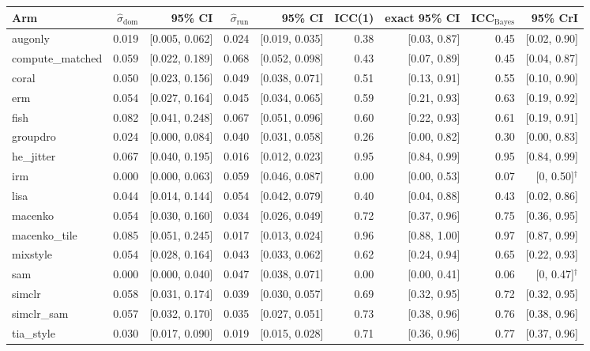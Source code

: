 \begin{tabular}{lrrrrrrrr}
\toprule
Arm & $\hat\sigma_\text{dom}$ & 95\% CI & $\hat\sigma_\text{run}$ & 95\% CI & ICC(1) & exact 95\% CI & ICC$_\text{Bayes}$ & 95\% CrI \\
\midrule
augonly & 0.019 & [0.005, 0.062] & 0.024 & [0.019, 0.035] & 0.38 & [0.03, 0.87] & 0.45 & [0.02, 0.90] \\
compute\_matched & 0.059 & [0.022, 0.189] & 0.068 & [0.052, 0.098] & 0.43 & [0.07, 0.89] & 0.45 & [0.04, 0.87] \\
coral & 0.050 & [0.023, 0.156] & 0.049 & [0.038, 0.071] & 0.51 & [0.13, 0.91] & 0.55 & [0.10, 0.90] \\
erm & 0.054 & [0.027, 0.164] & 0.045 & [0.034, 0.065] & 0.59 & [0.21, 0.93] & 0.63 & [0.19, 0.92] \\
fish & 0.082 & [0.041, 0.248] & 0.067 & [0.051, 0.096] & 0.60 & [0.22, 0.93] & 0.61 & [0.19, 0.91] \\
groupdro & 0.024 & [0.000, 0.084] & 0.040 & [0.031, 0.058] & 0.26 & [0.00, 0.82] & 0.30 & [0.00, 0.83] \\
he\_jitter & 0.067 & [0.040, 0.195] & 0.016 & [0.012, 0.023] & 0.95 & [0.84, 0.99] & 0.95 & [0.84, 0.99] \\
irm & 0.000 & [0.000, 0.063] & 0.059 & [0.046, 0.087] & 0.00 & [0.00, 0.53] & 0.07 & [0, 0.50]$^\dagger$ \\
lisa & 0.044 & [0.014, 0.144] & 0.054 & [0.042, 0.079] & 0.40 & [0.04, 0.88] & 0.43 & [0.02, 0.86] \\
macenko & 0.054 & [0.030, 0.160] & 0.034 & [0.026, 0.049] & 0.72 & [0.37, 0.96] & 0.75 & [0.36, 0.95] \\
macenko\_tile & 0.085 & [0.051, 0.245] & 0.017 & [0.013, 0.024] & 0.96 & [0.88, 1.00] & 0.97 & [0.87, 0.99] \\
mixstyle & 0.054 & [0.028, 0.164] & 0.043 & [0.033, 0.062] & 0.62 & [0.24, 0.94] & 0.65 & [0.22, 0.93] \\
sam & 0.000 & [0.000, 0.040] & 0.047 & [0.038, 0.071] & 0.00 & [0.00, 0.41] & 0.06 & [0, 0.47]$^\dagger$ \\
simclr & 0.058 & [0.031, 0.174] & 0.039 & [0.030, 0.057] & 0.69 & [0.32, 0.95] & 0.72 & [0.32, 0.95] \\
simclr\_sam & 0.057 & [0.032, 0.170] & 0.035 & [0.027, 0.051] & 0.73 & [0.38, 0.96] & 0.76 & [0.38, 0.96] \\
tia\_style & 0.030 & [0.017, 0.090] & 0.019 & [0.015, 0.028] & 0.71 & [0.36, 0.96] & 0.77 & [0.37, 0.96] \\
\bottomrule
\end{tabular}
